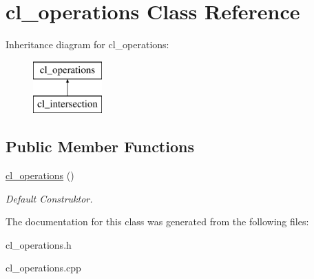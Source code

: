 \hypertarget{classcl__operations}{}\section{cl\+\_\+operations Class Reference}
\label{classcl__operations}
Inheritance diagram for cl\+\_\+operations\+:\begin{figure}[H]
\begin{center}
\leavevmode
\includegraphics[height=2.000000cm]{classcl__operations}
\end{center}
\end{figure}
\subsection*{Public Member Functions}
\begin{DoxyCompactItemize}
\item 
\hypertarget{classcl__operations_a8aa98833a975207320d3f1270258f4dd}{}\hyperlink{classcl__operations_a8aa98833a975207320d3f1270258f4dd}{cl\+\_\+operations} ()\label{classcl__operations_a8aa98833a975207320d3f1270258f4dd}

\begin{DoxyCompactList}\small\item\em Default Construktor. \end{DoxyCompactList}\end{DoxyCompactItemize}


The documentation for this class was generated from the following files\+:\begin{DoxyCompactItemize}
\item 
cl\+\_\+operations.\+h\item 
cl\+\_\+operations.\+cpp\end{DoxyCompactItemize}
